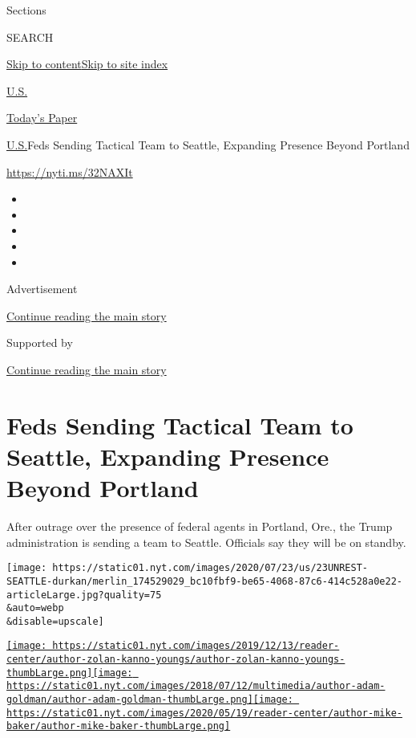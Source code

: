 Sections

SEARCH

\protect\hyperlink{site-content}{Skip to
content}\protect\hyperlink{site-index}{Skip to site index}

\href{https://www.nytimes.com/section/us}{U.S.}

\href{https://myaccount.nytimes.com/auth/login?response_type=cookie\&client_id=vi}{}

\href{https://www.nytimes.com/section/todayspaper}{Today's Paper}

\href{/section/us}{U.S.}\textbar{}Feds Sending Tactical Team to Seattle,
Expanding Presence Beyond Portland

\url{https://nyti.ms/32NAXIt}

\begin{itemize}
\item
\item
\item
\item
\item
\end{itemize}

Advertisement

\protect\hyperlink{after-top}{Continue reading the main story}

Supported by

\protect\hyperlink{after-sponsor}{Continue reading the main story}

\hypertarget{feds-sending-tactical-team-to-seattle-expanding-presence-beyond-portland}{%
\section{Feds Sending Tactical Team to Seattle, Expanding Presence
Beyond
Portland}\label{feds-sending-tactical-team-to-seattle-expanding-presence-beyond-portland}}

After outrage over the presence of federal agents in Portland, Ore., the
Trump administration is sending a team to Seattle. Officials say they
will be on standby.

\texttt{[image: https://static01.nyt.com/images/2020/07/23/us/23UNREST-SEATTLE-durkan/merlin\_174529029\_bc10fbf9-be65-4068-87c6-414c528a0e22-articleLarge.jpg?quality=75\\\&auto=webp\\\&disable=upscale]}

\href{https://www.nytimes.com/by/zolan-kanno-youngs}{\texttt{[image: https://static01.nyt.com/images/2019/12/13/reader-center/author-zolan-kanno-youngs/author-zolan-kanno-youngs-thumbLarge.png]}}\href{https://www.nytimes.com/by/adam-goldman}{\texttt{[image: https://static01.nyt.com/images/2018/07/12/multimedia/author-adam-goldman/author-adam-goldman-thumbLarge.png]}}\href{https://www.nytimes.com/by/mike-baker}{\texttt{[image: https://static01.nyt.com/images/2020/05/19/reader-center/author-mike-baker/author-mike-baker-thumbLarge.png]}}

